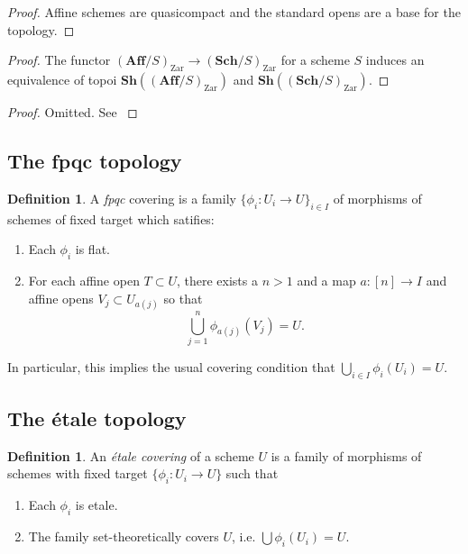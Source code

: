 \documentclass{amsart}
\newcommand{\Sch}{\mathbf{Sch}}
\newcommand{\Aff}{\mathbf{Aff}}
\newcommand{\Sh}{\mathbf{Sh}}
\DeclareMathOperator{\Zar}{Zar}
\theoremstyle{definition}
\newtheorem{definition}[theorem]{Definition}
\theoremstyle{remark}
\begin{document}
\begin{proof}
    Affine schemes are quasicompact and the standard opens are a base for the
    topology.
\end{proof}

\begin{proof}
    The functor $(\Aff/S)_{\Zar} \to (\Sch/S)_{\Zar}$ for a scheme $S$ induces an
    equivalence of topoi $\Sh((\Aff/S)_{\Zar})$ and $\Sh((\Sch/S)_{\Zar})$.
\end{proof}

\begin{proof}
    Omitted. See \cite[\href{https://stacks.math.columbia.edu/tag/020W}{Tag
        020W}]{stacks-project}
\end{proof}

\subsection{The fpqc topology}

\begin{definition}
    A \textit{fpqc} covering is a family $\{\phi_i : U_i \to U\}_{i \in I}$ of
    morphisms of schemes of fixed target which satifies:
    \begin{enumerate}
        \item Each $\phi_i$ is flat.
        \item For each affine open $T \subset U$, there exists a $n > 1$ and a
            map $a : [n] \to I$ and affine opens $V_j \subset U_{a(j)}$ so that
            \[
                \bigcup_{j=1}^n \phi_{a(j)}(V_j) = U.
            \]
    \end{enumerate}
    In particular, this implies the usual covering condition that $\bigcup_{i
        \in I} \phi_i(U_i) = U$.
\end{definition}

\subsection{The \'etale topology}

\begin{definition}
    An \textit{\'etale covering} of a scheme $U$ is a family of morphisms of
    schemes with fixed target $\{\phi_i : U_i \to U \}$ such that

    \begin{enumerate}
        \item Each $\phi_i$ is etale.
        \item The family set-theoretically covers $U$, i.e. $\bigcup
            \phi_i(U_i) = U$.
    \end{enumerate}
\end{definition}
\end{document}
